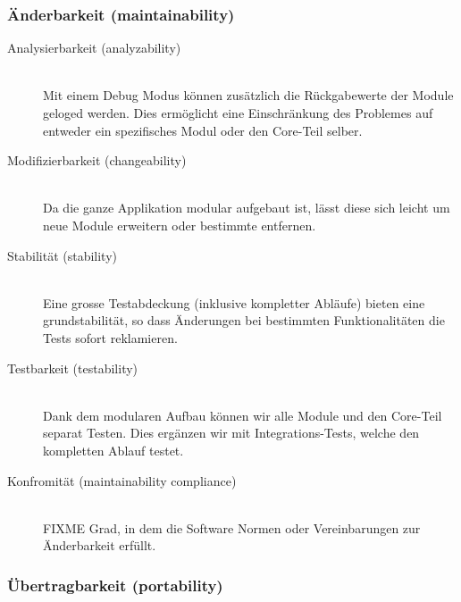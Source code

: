 \documentclass[a4paper]{article}
\begin{document}
\subsubsection{Änderbarkeit (maintainability)}

\begin{description}
  \item[Analysierbarkeit (analyzability)] \strut \\
    Mit einem Debug Modus können zusätzlich die Rückgabewerte der Module geloged werden.
    Dies ermöglicht eine Einschränkung des Problemes auf entweder ein spezifisches Modul oder den Core-Teil selber.
  \item[Modifizierbarkeit (changeability)] \strut \\
    Da die ganze Applikation modular aufgebaut ist, lässt diese sich leicht um neue Module erweitern oder bestimmte entfernen.
  \item[Stabilität (stability)] \strut \\
    Eine grosse Testabdeckung (inklusive kompletter Abläufe) bieten eine grundstabilität, so dass Änderungen bei bestimmten Funktionalitäten die Tests sofort reklamieren.
  \item[Testbarkeit (testability)] \strut \\
    Dank dem modularen Aufbau können wir alle Module und den Core-Teil separat Testen.
    Dies ergänzen wir mit Integrations-Tests, welche den kompletten Ablauf testet.
  \item[Konfromität (maintainability compliance)] \strut \\
    FIXME Grad, in dem die Software Normen oder Vereinbarungen zur Änderbarkeit erfüllt.
\end{description}

\subsubsection{Übertragbarkeit (portability)}
\end{document}
